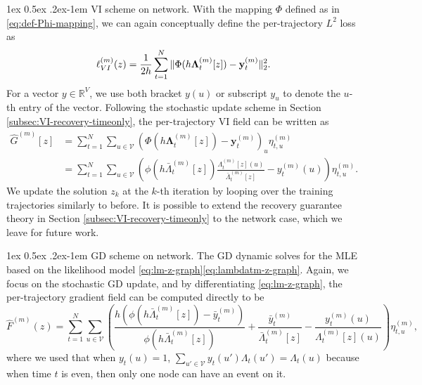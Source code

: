 \documentclass[11pt]{article}
\makeatletter
\theoremstyle{remark}
\theoremstyle{plain}
\newcommand{\calV}{\mathcal{V}}
\newcommand{\R}{\mathbb{R}}
\renewcommand{\paragraph}{%
  \@startsection{paragraph}{4}%
  {\z@}{1ex \@plus 0.5ex \@minus .2ex}{-1em}%
  {\normalfont\normalsize\itshape}%
}
\makeatother
\begin{document}
\paragraph{VI scheme on network.}
With the mapping $\Phi$ defined as in \eqref{eq:def-Phi-mapping}, we can again conceptually define the per-trajectory $L^2$ loss as
\[
\ell_{\rm VI}^{(m)}( z )
  = \frac{1}{2 h }\sum_{t=1}^N  \| \Phi( h \mathbf{\Lambda}_t^{(m)}[z] ) - \mathbf{y}_t^{(m)} \|_2^2.
\]
For a vector $y \in \R^V$, we use both bracket $y(u)$ or subscript $y_u$ to denote the $u$-th entry of the vector. 
Following the stochastic update scheme in Section \ref{subsec:VI-recovery-timeonly}, the per-trajectory VI field can be written as 
\begin{align}
\hat G^{(m)}[ z ] 
& =  \sum_{t=1}^N \sum_{u \in \calV } \left(\Phi ( h \mathbf{\Lambda}_t^{(m)}[ z ]) -  \mathbf{y}_t^{(m)} \right)_u \eta_{t,u}^{(m)} 
		\nonumber \\
& = \sum_{t=1}^N \sum_{u \in \calV } \left( \phi( h \bar \Lambda_t^{(m)}[ z ]) \frac{\Lambda_t^{(m)}[ z ](u)}{\bar \Lambda_t^{(m)}[ z ]}  -  y_t^{(m)} (u) \right) \eta_{t,u}^{(m)}.
	\label{eq:formula-Gtheta-graph}
\end{align}
We update the solution $z_k$ at the $k$-th iteration by looping over the training trajectories similarly to before. 
It is possible to extend the recovery guarantee theory in Section  \ref{subsec:VI-recovery-timeonly} to the network case, which we leave for future work.


\paragraph{GD scheme on network.}
The GD dynamic solves for the MLE based on the likelihood model \eqref{eq:lm-z-graph}\eqref{eq:lambdatm-z-graph}.  Again, we focus on the stochastic GD update, 
and by differentiating \eqref{eq:lm-z-graph}, the per-trajectory gradient field can be computed directly to be
\begin{equation}\label{eq:expression-hatFm-graph}
\hat F^{(m)}(z) = 
\sum_{t=1}^N  \sum_{u \in \calV}
 	\left( \frac{ h ( \phi( h  \bar \Lambda_t^{(m)}[ z] ) - \bar y_t^{(m)} )}{ \phi( h \bar \Lambda_t^{(m)} [z] )}     
	+ \frac{\bar y^{(m)}_t}{\bar \Lambda_t^{(m)}[ z] } 
	- \frac{y^{(m)}_t(u)}{ \Lambda_t^{(m)}[ z](u)}
	\right)
	\eta_{t,u}^{(m)},
\end{equation}
where we used that when $y_t(u) =1$, $\sum_{u' \in \calV} y_t(u') \Lambda_t(u') = \Lambda_t(u)$ because when time $t$ is even, then only one node can have an event on it.
\end{document}
